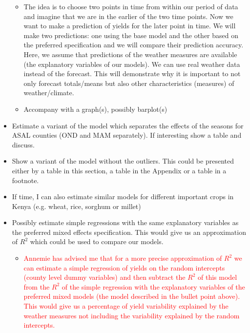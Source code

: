 \documentclass[a4paper,12pt]{article}
\begin{document}
\begin{itemize}
\begin{itemize}

\item The idea is to choose two points in time from within our period of data and imagine that we are in the earlier of the two time points. Now we want to make a prediction of yields for the later point in time. We will make two predictions: one using the base model and the other based on the preferred specification and we will compare their prediction accuracy. Here, we assume that predictions of the weather measures are available (the explanatory variables of our models). We can use real weather data instead of the forecast. This will demonstrate why it is important to not only forecast totals/means but also other characteristics (measures) of weather/climate.
		\item Accompany with a graph(s), possibly barplot(s)
\end{itemize}

\item Estimate a variant of the model which separates the effects of the seasons for ASAL counties (OND and MAM separately). If interesting show a table and discuss.

\item Show a variant of the model without the outliers. This could be presented either by a table in this section, a table in the Appendix or a table in a footnote. 

\item If time, I can also estimate similar models for different important crops in Kenya (e.g. wheat, rice, sorghum or millet)

\item Possibly estimate simple regressions with the same explanatory variables as the preferred mixed effects specification. This would give us an approximation of $R^2$ which could be used to compare our models.

		\begin{itemize}
			\item \textcolor{red}{Annemie has advised me that for a more precise approximation of $R^2$ we can estimate a simple regression of yields on the random intercepts (county level dummy variables) and then subtract the $R^2$ of this model from the $R^2$ of the simple regression with the explanatory variables of the preferred mixed models (the model described in the bullet point above). This would give us a percentage of yield variability explained by the weather measures not including the variability explained by the random intercepts.}
	\end{itemize}
		\end{itemize}
\end{document}
